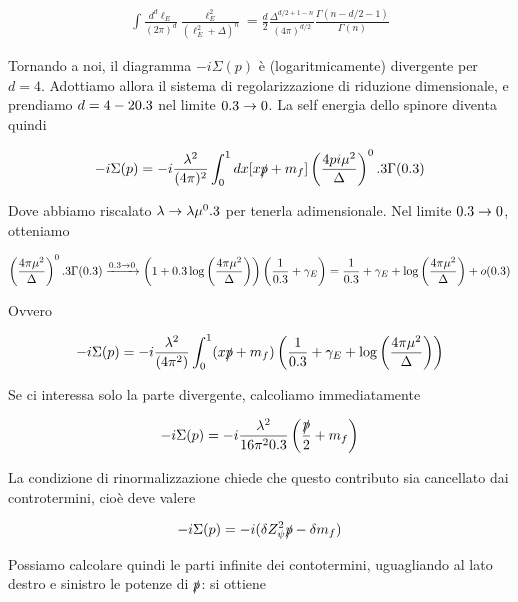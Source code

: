 \documentclass[11pt]{report}
\begin{document}
\begin{align}
    \int \frac{d^d\ell_E}{(2\pi)^d}\frac{\ell_E^2}{(\ell_E^2 + \Delta)^n} = \frac{d}{2}\frac{\Delta^{d/2+1-n}}{(4\pi)^{d/2}}\frac{\Gamma(n-d/2-1)}{\Gamma(n)}
\end{align}

Tornando a noi, il diagramma \(-i\Sigma(p)\) è (logaritmicamente) divergente per \(d=4\). Adottiamo allora il sistema di regolarizzazione di riduzione dimensionale, e prendiamo \(d = 4-20.3\) nel limite \(0.3 \to 0\). La self energia dello spinore diventa quindi 

\begin{align}
    -i\Sigma(p) = -i\frac{\lambda^2}{(4\pi)^2}\int_0^1 dx [x\slashed{p} + m_f]\left(\frac{4pi\mu^2}{\Delta} \right)^0.3 \Gamma(0.3)
\end{align}

Dove abbiamo riscalato \(\lambda \to \lambda\mu^0.3\) per tenerla adimensionale. Nel limite \(0.3 \to 0\), otteniamo 

\begin{align}
    \left(\frac{4\pi\mu^2}{\Delta} \right)^0.3 \Gamma(0.3) \xrightarrow{0.3 \to 0} \left(1+0.3\log\left(\frac{4\pi\mu^2}{\Delta} \right) \right)\left(\frac{1}{0.3} + \gamma_E \right) = \frac{1}{0.3} + \gamma_E + \log\left(\frac{4\pi\mu^2}{\Delta} \right) + o(0.3)
\end{align}

Ovvero 

\begin{align}
    -i\Sigma(p) = -i\frac{\lambda^2}{(4\pi^2)}\int_0^1(x\slashed{p} +m_f)\left(\frac{1}{0.3} + \gamma_E + \log\left(\frac{4\pi\mu^2}{\Delta} \right) \right)
\end{align}

Se ci interessa solo la parte divergente, calcoliamo immediatamente 

\begin{align}
    -i\Sigma(p) = -i\frac{\lambda^2}{16\pi^20.3}\left(\frac{\slashed{p}}{2} + m_f \right)
\end{align}

La condizione di rinormalizzazione chiede che questo contributo sia cancellato dai controtermini, cioè deve valere

\begin{align}
    -i\Sigma(p) = -i(\delta Z_\psi^2\slashed{p} - \delta m_f)
\end{align}

Possiamo calcolare quindi le parti infinite dei contotermini, uguagliando al lato destro e sinistro le potenze di \(\slashed{p}\): si ottiene 
\end{document}
